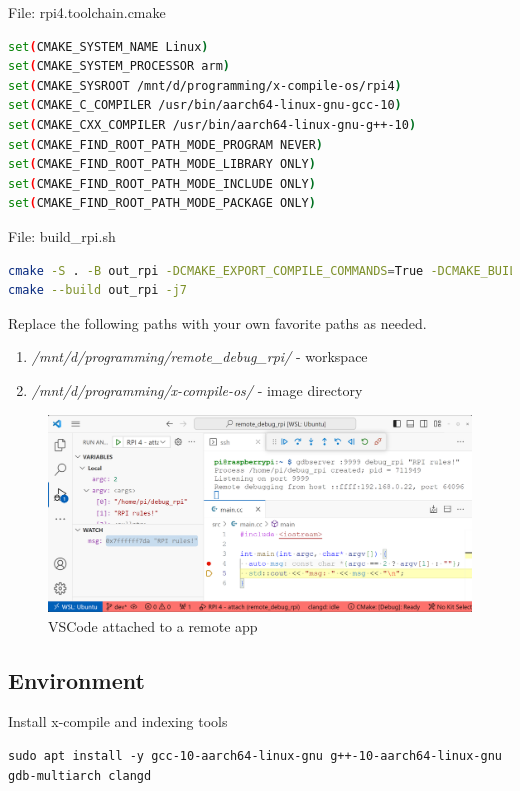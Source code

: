 \documentclass[twocolumn, 10pt]{article}
\begin{document}
\tiny{}File: rpi4.toolchain.cmake\small{}
\begin{lstlisting}[language=sh,breaklines=true,caption={}]
set(CMAKE_SYSTEM_NAME Linux)
set(CMAKE_SYSTEM_PROCESSOR arm)
set(CMAKE_SYSROOT /mnt/d/programming/x-compile-os/rpi4)
set(CMAKE_C_COMPILER /usr/bin/aarch64-linux-gnu-gcc-10)
set(CMAKE_CXX_COMPILER /usr/bin/aarch64-linux-gnu-g++-10)
set(CMAKE_FIND_ROOT_PATH_MODE_PROGRAM NEVER)
set(CMAKE_FIND_ROOT_PATH_MODE_LIBRARY ONLY)
set(CMAKE_FIND_ROOT_PATH_MODE_INCLUDE ONLY)
set(CMAKE_FIND_ROOT_PATH_MODE_PACKAGE ONLY)
\end{lstlisting}

\tiny{}File: build\_rpi.sh\small{}
\begin{lstlisting}[language=sh,breaklines=true,caption={}]
cmake -S . -B out_rpi -DCMAKE_EXPORT_COMPILE_COMMANDS=True -DCMAKE_BUILD_TYPE=Debug --toolchain rpi4.toolchain.cmake
cmake --build out_rpi -j7
\end{lstlisting}

Replace the following paths with your own favorite paths as needed.
\small
\begin{enumerate}
  \item \textit{/mnt/d/programming/remote\_debug\_rpi/} - workspace
  \item \textit{/mnt/d/programming/x-compile-os/} - image directory
\end{enumerate}


\begin{figure}
  \includegraphics[width=\linewidth]{res/remote_debug_rpi_light.png}
  \caption*{VSCode attached to a remote app}
  \label{fig:debug}
\end{figure}

\subsection*{Environment}
Install x-compile and indexing tools
\begin{lstlisting}[backgroundcolor=\color{gray!10},caption={}]
sudo apt install -y gcc-10-aarch64-linux-gnu g++-10-aarch64-linux-gnu gdb-multiarch clangd
\end{lstlisting}
\end{document}

